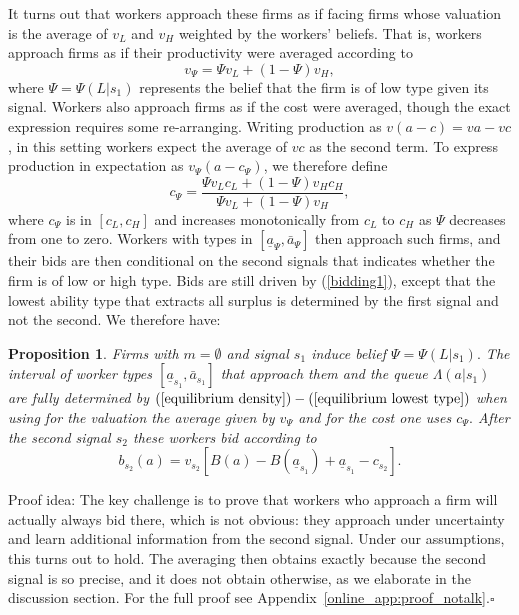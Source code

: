 \documentclass[12pt]{article}
\newtheorem{prop}{Proposition}
\begin{document}
It turns out that workers approach these firms as if facing firms whose valuation is the average of $v_{L}$ and $v_{H}$ weighted by the workers' beliefs. That is, workers approach firms as if their productivity were averaged according to
\begin{equation*}
v_{\Psi}=\Psi v_{L}+(1-\Psi)v_{H},
\end{equation*}%
where $\Psi=\Psi(L|s_{1})$ represents the belief that the firm is of low type given its signal. Workers also approach firms as if the cost were averaged, though the exact expression requires some re-arranging. Writing production as $v(a-c)=va-vc$, in this setting workers expect the average of $vc$ as the second term. To express production in expectation as $v_{\Psi}(a-c_{\Psi})$, we therefore define
\begin{equation*}
c_{\Psi}=\frac{\Psi v_{L}c_{L}+(1-\Psi)v_{H}c_{H}}{\Psi v_{L}+(1-\Psi)v_{H}},
\end{equation*}%
where $c_{\Psi}$ is in $[c_{L},c_{H}]$ and increases monotonically from $c_{L}$ to $c_{H}$ as $\Psi$ decreases from one to zero. Workers with types in $[\underline{a}_{\Psi },\bar{a}_{\Psi }]$ then approach such firms, and their bids are then conditional on the second signals that indicates whether the firm is of low or high type. Bids are still driven by (\ref{bidding1}), except that the lowest ability type that extracts all surplus is determined by the first signal and not the second$.$ We therefore have:

\begin{prop}
\label{equilibrium-notalk}Firms with $m=\emptyset $ and signal $s_{1}$
induce belief $\Psi =\Psi (L|s_{1}).$ The interval of worker types $[%
\underline{a}_{s_{1}},\bar{a}_{s_{1}}]$ that approach them and the queue $%
\Lambda (a|s_{1})$ are fully determined by $(\ref{equilibrium density})-(\ref%
{equilibrium lowest type})$ when using for the valuation the average given
by $v_{\Psi }$ and for the cost one uses $c_{\Psi }.$ After the second
signal $s_{2}$ these workers bid according to%
\begin{equation}
b_{s_{2}}(a)=v_{s_{2}}[B(a)-B(\underline{a}_{s_{1}})+\underline{a}%
_{s_{1}}-c_{s_{2}}].  \label{wages-general}
\end{equation}
\end{prop}

\noindent Proof idea: The key challenge is to prove that workers who approach a firm will actually always bid there, which is not obvious: they approach under uncertainty and learn additional information from the second signal. Under our assumptions, this turns out to hold. The averaging then obtains exactly because the second signal is so precise, and it does not obtain otherwise, as we elaborate in the discussion section. For the full proof see Appendix~\ref{online_app:proof_notalk}.$\square$\bigskip
\end{document}
